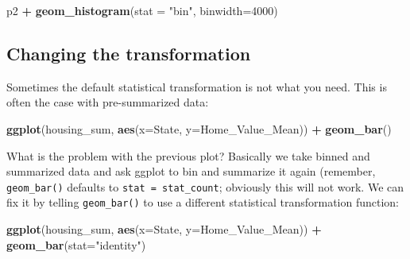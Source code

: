 \documentclass[
]{book}
\newenvironment{Shaded}{\begin{snugshade}}{\end{snugshade}}
\newcommand{\DataTypeTok}[1]{\textcolor[rgb]{0.13,0.29,0.53}{#1}}
\newcommand{\DecValTok}[1]{\textcolor[rgb]{0.00,0.00,0.81}{#1}}
\newcommand{\KeywordTok}[1]{\textcolor[rgb]{0.13,0.29,0.53}{\textbf{#1}}}
\newcommand{\NormalTok}[1]{#1}
\newcommand{\OperatorTok}[1]{\textcolor[rgb]{0.81,0.36,0.00}{\textbf{#1}}}
\newcommand{\StringTok}[1]{\textcolor[rgb]{0.31,0.60,0.02}{#1}}
\begin{document}
\begin{Shaded}
\begin{Highlighting}[]
\NormalTok{p2 }\OperatorTok{+}\StringTok{ }\KeywordTok{geom_histogram}\NormalTok{(}\DataTypeTok{stat =} \StringTok{"bin"}\NormalTok{, }\DataTypeTok{binwidth=}\DecValTok{4000}\NormalTok{)}
\end{Highlighting}
\end{Shaded}

\hypertarget{changing-the-transformation}{%
\subsection{Changing the transformation}\label{changing-the-transformation}}

Sometimes the default statistical transformation is not what you need. This is often the case with pre-summarized data:

\begin{Shaded}
\end{Shaded}

\begin{Shaded}
\begin{Highlighting}[]
\KeywordTok{ggplot}\NormalTok{(housing_sum, }\KeywordTok{aes}\NormalTok{(}\DataTypeTok{x=}\NormalTok{State, }\DataTypeTok{y=}\NormalTok{Home_Value_Mean)) }\OperatorTok{+}\StringTok{ }
\StringTok{  }\KeywordTok{geom_bar}\NormalTok{()}
\end{Highlighting}
\end{Shaded}

What is the problem with the previous plot? Basically we take binned and summarized data and ask ggplot to bin and summarize it again (remember, \texttt{geom\_bar()} defaults to \texttt{stat\ =\ stat\_count}; obviously this will not work. We can fix it by telling \texttt{geom\_bar()} to use a different statistical transformation function:

\begin{Shaded}
\begin{Highlighting}[]
\KeywordTok{ggplot}\NormalTok{(housing_sum, }\KeywordTok{aes}\NormalTok{(}\DataTypeTok{x=}\NormalTok{State, }\DataTypeTok{y=}\NormalTok{Home_Value_Mean)) }\OperatorTok{+}\StringTok{ }
\StringTok{  }\KeywordTok{geom_bar}\NormalTok{(}\DataTypeTok{stat=}\StringTok{"identity"}\NormalTok{)}
\end{Highlighting}
\end{Shaded}
\end{document}
